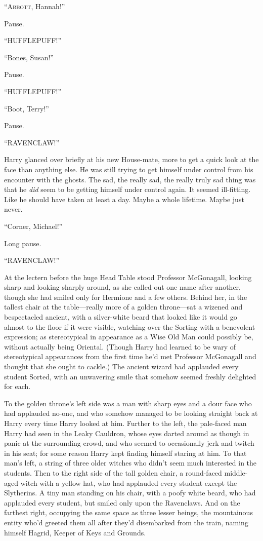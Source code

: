 
\lettrine{“A}{bbott}, Hannah!”

\quad\quad
Pause.

“HUFFLEPUFF!”

“Bones, Susan!”

Pause.

“HUFFLEPUFF!”

“Boot, Terry!”

Pause.

“RAVENCLAW!”

Harry glanced over briefly at his new House-mate, more to get a quick look at
the face than anything else. He was still trying to get himself under control
from his encounter with the ghosts. The sad, the really sad, the really truly
sad thing was that he \emph{did} seem to be getting himself under control
again. It seemed ill-fitting. Like he should have taken at least a day. Maybe a
whole lifetime. Maybe just never.

“Corner, Michael!”

Long pause.

“RAVENCLAW!”

At the lectern before the huge Head Table stood Professor McGonagall, looking
sharp and looking sharply around, as she called out one name after another,
though she had smiled only for Hermione and a few others. Behind her, in the
tallest chair at the table—really more of a golden throne—sat a wizened and
bespectacled ancient, with a silver-white beard that looked like it would go
almost to the floor if it were visible, watching over the Sorting with a
benevolent expression; as stereotypical in appearance as a Wise Old Man could
possibly be, without actually being Oriental. (Though Harry had learned to be
wary of stereotypical appearances from the first time he’d met Professor
McGonagall and thought that she ought to cackle.) The ancient wizard had
applauded every student Sorted, with an unwavering smile that somehow seemed
freshly delighted for each.

To the golden throne’s left side was a man with sharp eyes and a dour face who
had applauded no-one, and who somehow managed to be looking straight back at
Harry every time Harry looked at him. Further to the left, the pale-faced man
Harry had seen in the Leaky Cauldron, whose eyes darted around as though in
panic at the surrounding crowd, and who seemed to occasionally jerk and twitch
in his seat; for some reason Harry kept finding himself staring at him. To that
man’s left, a string of three older witches who didn’t seem much interested in
the students. Then to the right side of the tall golden chair, a round-faced
middle-aged witch with a yellow hat, who had applauded every student except the
Slytherins. A tiny man standing on his chair, with a poofy white beard, who had
applauded every student, but smiled only upon the Ravenclaws. And on the
farthest right, occupying the same space as three lesser beings, the
mountainous entity who’d greeted them all after they’d disembarked from the
train, naming himself Hagrid, Keeper of Keys and Grounds.

